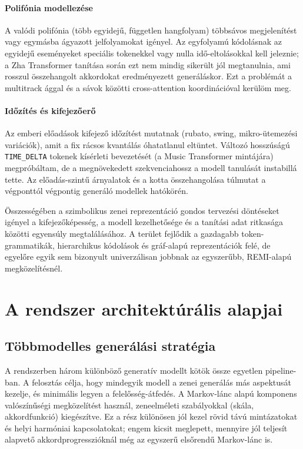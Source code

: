 \paragraph{Polifónia modellezése} A valódi polifónia (több egyidejű, független hangfolyam) többsávos megjelenítést vagy egymásba ágyazott jelfolyamokat igényel. Az egyfolyamú kódolásnak az egyidejű eseményeket speciális tokenekkel vagy nulla idő-eltolásokkal kell jeleznie; a Zha Transformer tanítása során ezt nem mindig sikerült jól megtanulnia, ami rosszul összehangolt akkordokat eredményezett generáláskor. Ezt a problémát a multitrack ággal és a sávok közötti cross-attention koordinációval kerülöm meg.

\paragraph{Időzítés és kifejezőerő} Az emberi előadások kifejező időzítést mutatnak (rubato, swing, mikro-ütemezési variációk), amit a fix rácsos kvantálás óhatatlanul eltüntet. Változó hosszúságú \texttt{TIME\_DELTA} tokenek kísérleti bevezetését (a Music Transformer \cite{huang2018music} mintájára) megpróbáltam, de a megnövekedett szekvenciahossz a modell tanulását instabillá tette. Az előadás-szintű árnyalatok és a kotta összehangolása túlmutat a végponttól végpontig generáló modellek hatókörén.

Összességében a szimbolikus zenei reprezentáció gondos tervezési döntéseket igényel a kifejezőképesség, a modell kezelhetősége és a tanítási adat ritkasága közötti egyensúly megtalálásához. A terület fejlődik a gazdagabb token-grammatikák, hierarchikus kódolások és gráf-alapú reprezentációk felé, de egyelőre egyik sem bizonyult univerzálisan jobbnak az egyszerűbb, REMI-alapú megközelítésnél.

\section{A rendszer architektúrális alapjai}

\subsection{Többmodelles generálási stratégia}

A rendszerben három különböző generatív modellt kötök össze egyetlen pipeline-ban. A felosztás célja, hogy mindegyik modell a zenei generálás más aspektusát kezelje, és minimális legyen a felelősség-átfedés. A Markov-lánc alapú komponens valószínűségi megközelítést használ, zeneelméleti szabályokkal (skála, akkordfunkció) kiegészítve. Ez a rész különösen jól kezel rövid távú mintázatokat és helyi harmóniai kapcsolatokat; engem kicsit meglepett, mennyire jól teljesít alapvető akkordprogresszióknál még az egyszerű elsőrendű Markov-lánc is.

